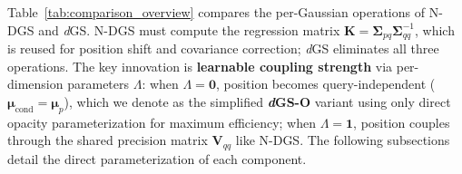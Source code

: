 \documentclass{article}
\newcommand{\modelname}{\textit{d}GS}
\theoremstyle{plain}
\theoremstyle{definition}
\theoremstyle{remark}
\begin{document}
\begin{table}[t!]
\centering
\caption{Per-Gaussian operations: N-DGS (implicit) vs \modelname{} (direct). In N-DGS, $\mathbf{K} = \boldsymbol{\Sigma}_{pq}\boldsymbol{\Sigma}_{qq}^{-1}$ is reused for position shift and covariance correction. \modelname{} eliminates inversion, regression, and covariance correction.}
\label{tab:comparison_overview}
\setlength{\tabcolsep}{4pt}
\vspace{-1em}
\end{table}

Table~\ref{tab:comparison_overview} compares the per-Gaussian operations of N-DGS and \modelname{}. N-DGS must compute the regression matrix $\mathbf{K} = \boldsymbol{\Sigma}_{pq}\boldsymbol{\Sigma}_{qq}^{-1}$, which is reused for position shift and covariance correction; \modelname{} eliminates all three operations. The key innovation is \textbf{learnable coupling strength} via per-dimension parameters $\Lambda$: when $\Lambda = \mathbf{0}$, position becomes query-independent ($\boldsymbol{\mu}_{\text{cond}} = \boldsymbol{\mu}_p$), which we denote as the simplified \textbf{\textit{d}GS-O} variant using only direct opacity parameterization for maximum efficiency; when $\Lambda = \mathbf{1}$, position couples through the shared precision matrix $\mathbf{V}_{qq}$ like N-DGS. The following subsections detail the direct parameterization of each component.
\end{document}
